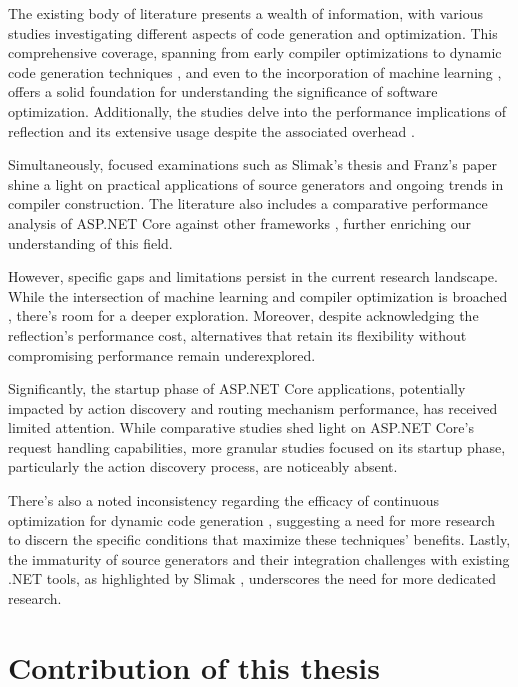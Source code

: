The existing body of literature presents a wealth of information, with various studies investigating different aspects of code generation and optimization. This comprehensive coverage, spanning from early compiler optimizations \cite{Aho2007} to dynamic code generation techniques \cite{Kistler2003}, and even to the incorporation of machine learning \cite{Shreyas2021}, offers a solid foundation for understanding the significance of software optimization. Additionally, the studies delve into the performance implications of reflection and its extensive usage despite the associated overhead \cite{Tudose2013, Beaumont2022}.

Simultaneously, focused examinations such as Slimak's thesis \cite{Slimak2022} and Franz's paper \cite{Franz2022} shine a light on practical applications of source generators and ongoing trends in compiler construction. The literature also includes a comparative performance analysis of ASP.NET Core against other frameworks \cite{Kronis2018, Karlsson2021}, further enriching our understanding of this field.

However, specific gaps and limitations persist in the current research landscape. While the intersection of machine learning and compiler optimization is broached \cite{Shreyas2021}, there's room for a deeper exploration. Moreover, despite acknowledging the reflection's performance cost, alternatives that retain its flexibility without compromising performance remain underexplored.

Significantly, the startup phase of ASP.NET Core applications, potentially impacted by action discovery and routing mechanism performance, has received limited attention. While comparative studies shed light on ASP.NET Core's request handling capabilities, more granular studies focused on its startup phase, particularly the action discovery process, are noticeably absent.

There's also a noted inconsistency regarding the efficacy of continuous optimization for dynamic code generation \cite{Kistler2003}, suggesting a need for more research to discern the specific conditions that maximize these techniques' benefits. Lastly, the immaturity of source generators and their integration challenges with existing .NET tools, as highlighted by Slimak \cite{Slimak2022}, underscores the need for more dedicated research.

\section{Contribution of this thesis}

